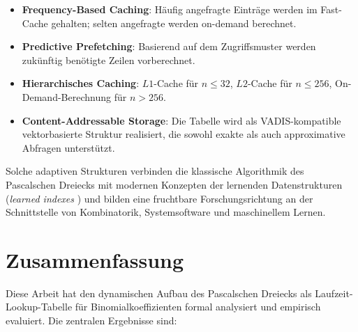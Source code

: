 ﻿\documentclass[12pt, a4paper]{article}
\theoremstyle{plain}
\theoremstyle{definition}
\theoremstyle{remark}
\begin{document}
\begin{itemize}
  \item \textbf{Frequency-Based Caching}: Häufig angefragte Einträge
        werden im Fast-Cache gehalten; selten angefragte werden on-demand
        berechnet.
  \item \textbf{Predictive Prefetching}: Basierend auf dem
        Zugriffsmuster werden zukünftig benötigte Zeilen vorberechnet.
  \item \textbf{Hierarchisches Caching}: $L1$-Cache für $n \le 32$,
        $L2$-Cache für $n \le 256$, On-Demand-Berechnung für $n > 256$.
  \item \textbf{Content-Addressable Storage}: Die Tabelle wird als
        VADIS-kompatible \cite{epp2026vadis} vektorbasierte Struktur
        realisiert, die sowohl exakte als auch approximative Abfragen
        unterstützt.
\end{itemize}

Solche adaptiven Strukturen verbinden die klassische Algorithmik des
Pascalschen Dreiecks mit modernen Konzepten der lernenden
Datenstrukturen (\emph{learned indexes} \cite{kraska2018case}) und
bilden eine fruchtbare Forschungsrichtung an der Schnittstelle
von Kombinatorik, Systemsoftware und maschinellem Lernen.


\section{Zusammenfassung}
\label{sec:zusammenfassung}

Diese Arbeit hat den dynamischen Aufbau des Pascalschen Dreiecks als
Laufzeit-Lookup-Tabelle für Binomialkoeffizienten formal analysiert
und empirisch evaluiert. Die zentralen Ergebnisse sind:
\end{document}
